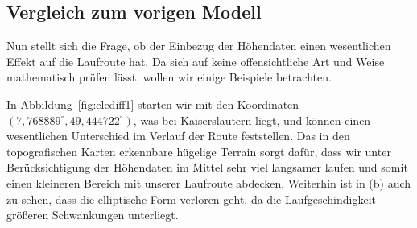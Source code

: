 \documentclass[
    paper=a4,
    DIV14,
    fontsize=12pt,
    pagesize=pdftex,
    toc=bibliographynumbered
]{scrartcl}
\numberwithin{figure}{section}
\numberwithin{equation}{section}
\numberwithin{table}{section}
\begin{document}
\subsection{Vergleich zum vorigen Modell}
Nun stellt sich die Frage, ob der Einbezug der Höhendaten einen wesentlichen Effekt auf
die Laufroute hat. Da sich auf keine offensichtliche Art und Weise mathematisch prüfen
lässt, wollen wir einige Beispiele betrachten.

In Abbildung~\ref{fig:elediff1} starten wir mit den Koordinaten $(7{,}768889^\circ,
49{,}444722^\circ)$, was bei Kaiserslautern liegt, und können einen wesentlichen Unterschied im
Verlauf der Route feststellen. Das in den topografischen Karten erkennbare hügelige
Terrain sorgt dafür, dass wir unter Berücksichtigung der Höhendaten im Mittel sehr viel
langsamer laufen und somit einen kleineren Bereich mit unserer Laufroute abdecken.
Weiterhin ist in (b) auch zu sehen, dass die elliptische Form verloren geht, da die
Laufgeschindigkeit größeren Schwankungen unterliegt.
\end{document}
